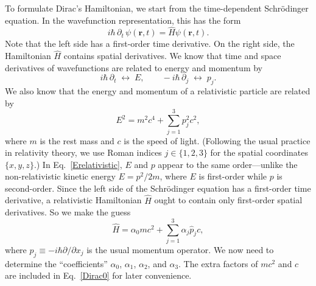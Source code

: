 \documentclass[pra,12pt]{revtex4}
\begin{document}
To formulate Dirac's Hamiltonian, we start from the time-dependent
Schr\"odinger equation.  In the wavefunction representation, this has
the form
\begin{equation}
  i\hbar\, \partial_t\, \psi(\mathbf{r},t)
  = \hat{H} \psi(\mathbf{r},t).
\end{equation}
Note that the left side has a first-order time derivative.  On the
right side, the Hamiltonian $\hat{H}$ contains spatial derivatives.
We know that time and space derivatives of wavefunctions are related
to energy and momentum by
\begin{equation}
    i\hbar\, \partial_t\; \leftrightarrow \;
    E, \qquad
    -i\hbar\, \partial_j \;\leftrightarrow \;
    p_j.
\end{equation}
We also know that the energy and momentum of a relativistic particle
are related by
\begin{equation}
  E^2 = m^2c^4 + \sum_{j=1}^3 p_j^2c^2,
  \label{Erelativistic}
\end{equation}
where $m$ is the rest mass and $c$ is the speed of light.  (Following
the usual practice in relativity theory, we use Roman indices $j \in
\{1,2,3\}$ for the spatial coordinates $\{x,y,z\}$.)  In
Eq.~\eqref{Erelativistic}, $E$ and $p$ appear to the same
order---unlike the non-relativistic kinetic energy $E = p^2/2m$, where
$E$ is first-order while $p$ is second-order.  Since the left side of
the Schr\"odinger equation has a first-order time derivative, a
relativistic Hamiltonian $\hat{H}$ ought to contain only first-order
spatial derivatives.  So we make the guess
\begin{equation}
  \hat{H} = \alpha_0 mc^2 + \sum_{j=1}^3 \alpha_j \hat{p}_j c,
  \label{Dirac0}
\end{equation}
where $\hat{p}_j \equiv -i\hbar \partial/\partial x_j$ is the usual
momentum operator.  We now need to determine the ``coefficients''
$\alpha_0$, $\alpha_1$, $\alpha_2$, and $\alpha_3$.  The extra factors
of $mc^2$ and $c$ are included in Eq.~\eqref{Dirac0} for later
convenience.
\end{document}
